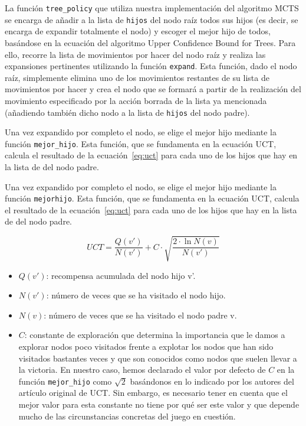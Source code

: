 \documentclass[conference]{IEEEtran}
\begin{document}
La función \texttt{tree\_policy} que utiliza nuestra implementación del algoritmo MCTS se encarga de añadir a la lista de \texttt{hijos} del nodo raíz todos sus hijos (es decir, se encarga de expandir totalmente el nodo) y escoger el mejor hijo de todos, basándose en la ecuación del algoritmo Upper Confidence Bound for Trees. Para ello, recorre la lista de movimientos por hacer del nodo raíz y realiza las expansiones pertinentes utilizando la función \texttt{expand}. Esta función, dado el nodo raíz, simplemente elimina uno de los movimientos restantes de su lista de movimientos por hacer y crea el nodo que se formará a partir de la realización del movimiento especificado por la acción borrada de la lista ya mencionada (añadiendo también dicho nodo a la lista de \texttt{hijos} del nodo padre).

Una vez expandido por completo el nodo, se elige el mejor hijo mediante la función \texttt{mejor\_hijo}. Esta función, que se fundamenta en la ecuación UCT, calcula el resultado de la ecuación~\eqref{eq:uct} para cada uno de los hijos que hay en la lista de del nodo padre.

Una vez expandido por completo el nodo, se elige el mejor hijo mediante la función \texttt{mejorhijo}. Esta función, que se fundamenta en la ecuación UCT, calcula el resultado de la ecuación~\eqref{eq:uct} para cada uno de los hijos que hay en la lista de del nodo padre.

\begin{equation}
UCT = \frac{Q(v')}{N(v')} + C \cdot \sqrt{\frac{2 \cdot \ln N(v)}{N(v')}}
\label{eq:uct}
\end{equation}

\begin{itemize}
    \item $Q(v')$: recompensa acumulada del nodo hijo v'.
    \item $N(v')$: número de veces que se ha visitado el nodo hijo.
    \item $N(v)$: número de veces que se ha visitado el nodo padre v.
    \item $C$: constante de exploración que determina la importancia que le damos a explorar nodos poco visitados frente a explotar los nodos que han sido visitados bastantes veces y que son conocidos como nodos que suelen llevar a la victoria. En nuestro caso, hemos declarado el valor por defecto de $C$ en la función \texttt{mejor\_hijo} como $\sqrt{2}$ basándonos en lo indicado por los autores del artículo original de UCT. Sin embargo, es necesario tener en cuenta que el mejor valor para esta constante no tiene por qué ser este valor y que depende mucho de las circunstancias concretas del juego en cuestión.
\end{itemize}
\end{document}
